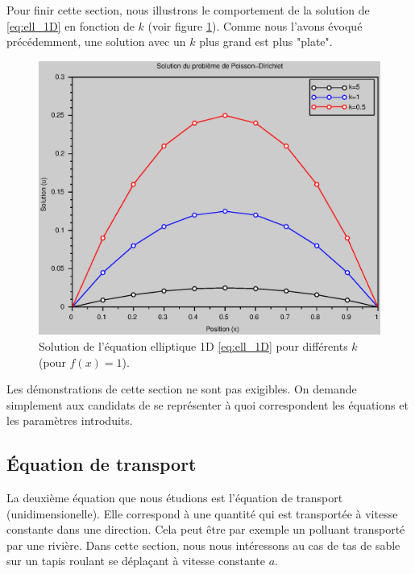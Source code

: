 \documentclass[12pt,a4paper,twoside]{article}
\begin{document}
Pour finir cette section, nous illustrons le comportement
de la solution de \eqref{eq:ell_1D} en fonction de $k$
(voir figure \ref{fig:ell_k}).
Comme nous l'avons \'evoqu\'e pr\'ec\'edemment, une solution avec 
un $k$ plus grand est plus "plate".


\begin{figure}[h]
  \centering
  \includegraphics[width = 12cm]{Figures/Poisson_k.eps}
  \caption{Solution de l'\'equation elliptique 1D \eqref{eq:ell_1D}
  pour diff\'erents $k$ (pour $f(x)=1$).}
  \label{fig:ell_k}
\end{figure}


\begin{remark}
  Les d\'emonstrations de cette section ne sont pas exigibles.
  On demande simplement aux candidats de se repr\'esenter \`a quoi
  correspondent les \'equations et les param\`etres introduits.
\end{remark}

\subsection{\'Equation de transport}

La deuxi\`eme \'equation que nous \'etudions est l'\'equation de transport
(unidimensionelle).
Elle correspond \`a une quantit\'e qui est transport\'ee \`a vitesse
constante dans une direction.
Cela peut \^etre par exemple un polluant transport\'e par une rivi\`ere.
Dans cette section, nous nous int\'eressons au cas de tas de sable
sur un tapis roulant se d\'epla\c{c}ant \`a vitesse constante $a$.
\end{document}
